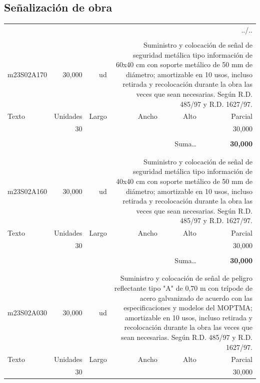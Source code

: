 \documentclass{book}%
\begin{document}
\subsection{Señalización de obra}%
\begin{longtable}{lrrrrr}%
\multicolumn{6}{r}{../..}\\%
\endfoot%
\endlastfoot%
&&&&&\\%
m23S02A170&    30,000& ud&\multicolumn{3}{p{6cm}}{\scriptsize Suministro y colocación de señal de seguridad metálica tipo información de 60x40 cm con soporte metálico de 50 mm de diámetro; amortizable en 10 usos, incluso retirada y recolocación durante la obra las veces que sean necesarias. Según R.D. 485/97 y R.D. 1627/97.\normalsize}\\%
Texto&Unidades&Largo&Ancho&Alto&Parcial\\%
\hline%
\multicolumn{1}{p{3.5cm}}{ }&30&&&&    30,000\\%
&&&&&\\%
\multicolumn{5}{r}{Suma\ldots}&\textbf{    30,000}\\%
\hline%
&&&&&\\%
&&&&&\\%
m23S02A160&    30,000& ud&\multicolumn{3}{p{6cm}}{\scriptsize Suministro y colocación de señal de seguridad metálica tipo información de 40x40 cm con soporte metálico de 50 mm de diámetro; amortizable en 10 usos, incluso retirada y recolocación durante la obra las veces que sean necesarias. Según R.D. 485/97 y R.D. 1627/97.\normalsize}\\%
Texto&Unidades&Largo&Ancho&Alto&Parcial\\%
\hline%
\multicolumn{1}{p{3.5cm}}{ }&30&&&&    30,000\\%
&&&&&\\%
\multicolumn{5}{r}{Suma\ldots}&\textbf{    30,000}\\%
\hline%
&&&&&\\%
&&&&&\\%
m23S02A030&    30,000& ud&\multicolumn{3}{p{6cm}}{\scriptsize Suministro y colocación de señal de peligro reflectante tipo "A" de 0,70 m con trípode de acero galvanizado de acuerdo con las especificaciones y modelos del MOPTMA; amortizable en 10 usos, incluso retirada y recolocación durante la obra las veces que sean necesarias. Según R.D. 485/97 y R.D. 1627/97.\normalsize}\\%
Texto&Unidades&Largo&Ancho&Alto&Parcial\\%
\hline%
\multicolumn{1}{p{3.5cm}}{ }&30&&&&    30,000\\%

\end{longtable}
\end{document}
